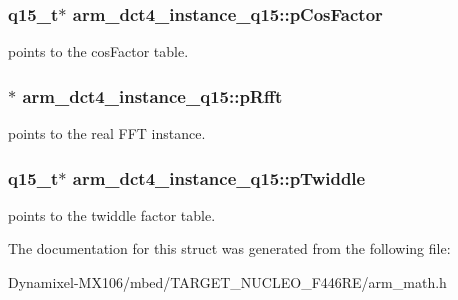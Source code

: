 \subsubsection[{\texorpdfstring{p\+Cos\+Factor}{pCosFactor}}]{\setlength{\rightskip}{0pt plus 5cm}q15\+\_\+t$\ast$ arm\+\_\+dct4\+\_\+instance\+\_\+q15\+::p\+Cos\+Factor}\hypertarget{structarm__dct4__instance__q15_ac76df681b1bd502fb4874c06f055dded}{}\label{structarm__dct4__instance__q15_ac76df681b1bd502fb4874c06f055dded}
points to the cos\+Factor table. 
\subsubsection[{\texorpdfstring{p\+Rfft}{pRfft}}]{$\ast$ arm\+\_\+dct4\+\_\+instance\+\_\+q15\+::p\+Rfft}\hypertarget{structarm__dct4__instance__q15_a11cf95c1cd9dd2dd5e4b81b8f88dc208}{}\label{structarm__dct4__instance__q15_a11cf95c1cd9dd2dd5e4b81b8f88dc208}
points to the real F\+FT instance. 
\subsubsection[{\texorpdfstring{p\+Twiddle}{pTwiddle}}]{\setlength{\rightskip}{0pt plus 5cm}q15\+\_\+t$\ast$ arm\+\_\+dct4\+\_\+instance\+\_\+q15\+::p\+Twiddle}\hypertarget{structarm__dct4__instance__q15_abc6c847e9f906781e1d5da40e9aafa76}{}\label{structarm__dct4__instance__q15_abc6c847e9f906781e1d5da40e9aafa76}
points to the twiddle factor table. 

The documentation for this struct was generated from the following file\+:\begin{DoxyCompactItemize}
\item 
Dynamixel-\/\+M\+X106/mbed/\+T\+A\+R\+G\+E\+T\+\_\+\+N\+U\+C\+L\+E\+O\+\_\+\+F446\+R\+E/arm\+\_\+math.\+h\end{DoxyCompactItemize}
